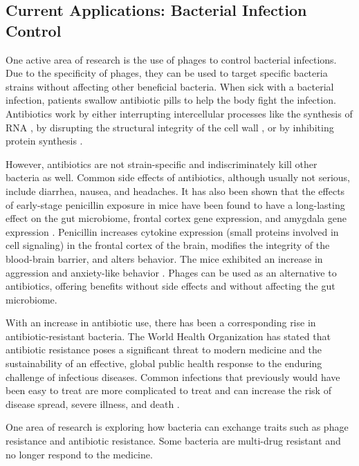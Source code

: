 \subsection{Current Applications: Bacterial Infection Control}
One active area of research is the use of phages to control bacterial infections.
Due to the specificity of phages, they can be used to target specific bacteria strains without affecting other beneficial bacteria.
When sick with a bacterial infection, patients swallow antibiotic pills to help the body fight the infection.
Antibiotics work by either interrupting intercellular processes like the synthesis of RNA \cite{flossRifamycinModeActionResistance2005}, by disrupting the structural integrity of the cell wall \cite{tomaszMechanismIrreversibleAntimicrobial1979}, or by inhibiting protein synthesis \cite{vakulenkoVersatilityAminoglycosidesProspects2003}.

However, antibiotics are not strain-specific and indiscriminately kill other bacteria as well.
Common side effects of antibiotics, although usually not serious, include diarrhea, nausea, and headaches.
It has also been shown that the effects of early-stage penicillin exposure in mice have been found to have a long-lasting effect on the gut microbiome, frontal cortex gene expression, and amygdala gene expression \cite{volkovaEffectsEarlylifePenicillin2021}.
Penicillin increases cytokine expression (small proteins involved in cell signaling) in the frontal cortex of the brain, modifies the integrity of the blood-brain barrier, and alters behavior.
The mice exhibited an increase in aggression and anxiety-like behavior \cite{leclercqLowdosePenicillinEarly2017}.
Phages can be used as an alternative to antibiotics, offering benefits without side effects and without affecting the gut microbiome. 

With an increase in antibiotic use, there has been a corresponding rise in antibiotic-resistant bacteria.
The World Health Organization has stated that antibiotic resistance poses a significant threat to modern medicine and the sustainability of an effective, global public health response to the enduring challenge of infectious diseases.
Common infections that previously would have been easy to treat are more complicated to treat and can increase the risk of disease spread, severe illness, and death \cite{GlobalActionPlan}. 

One area of research is exploring how bacteria can exchange traits such as phage resistance and antibiotic resistance.
Some bacteria are multi-drug resistant and no longer respond to the medicine.

